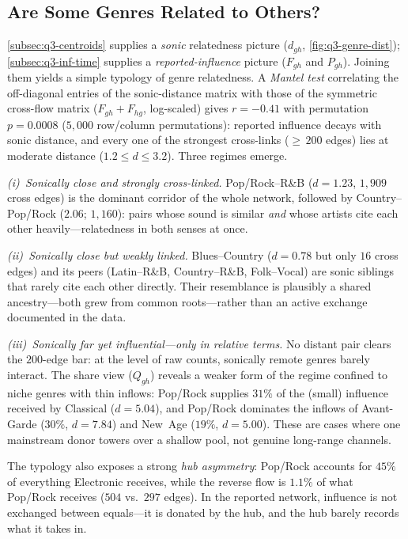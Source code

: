 \subsection{Are Some Genres Related to Others?}\label{subsec:q3-related}

\cref{subsec:q3-centroids} supplies a \emph{sonic} relatedness picture
($d_{gh}$, \cref{fig:q3-genre-dist}); \cref{subsec:q3-inf-time} supplies a
\emph{reported-influence} picture ($F_{gh}$ and $P_{gh}$). Joining them
yields a simple typology of genre relatedness. A \emph{Mantel test}
correlating the off-diagonal entries of the sonic-distance matrix with
those of the symmetric cross-flow matrix ($F_{gh}+F_{hg}$,
log-scaled) gives $r=-0.41$ with permutation $p=0.0008$
($5{,}000$ row/column permutations): reported influence decays with sonic
distance, and every one of the strongest cross-links
(${\ge}\,200$ edges) lies at moderate distance
($1.2\le d\le 3.2$). Three regimes emerge.

\emph{(i)~Sonically close and strongly cross-linked.} Pop/Rock--R\&B
($d=1.23$, $1{,}909$ cross edges) is the dominant corridor of the whole
network, followed by Country--Pop/Rock ($2.06$; $1{,}160$): pairs whose
sound is similar \emph{and} whose artists cite each other
heavily---relatedness in both senses at once.

\emph{(ii)~Sonically close but weakly linked.} Blues--Country
($d=0.78$ but only $16$ cross edges) and its peers (Latin--R\&B,
Country--R\&B, Folk--Vocal) are sonic siblings that rarely cite each
other directly. Their resemblance is plausibly a shared
ancestry---both grew from common roots---rather than
an active exchange documented in the data.

\emph{(iii)~Sonically far yet influential---only in relative terms.} No
distant pair clears the $200$-edge bar: at the level of raw counts,
sonically remote genres barely interact. The share view
($Q_{gh}$) reveals a weaker form of the regime confined to niche genres
with thin inflows: Pop/Rock supplies $31\%$ of the (small) influence
received by Classical ($d=5.04$), and Pop/Rock dominates the inflows of
Avant-Garde ($30\%$, $d=7.84$) and New~Age ($19\%$, $d=5.00$). These are
cases where one mainstream donor towers over a shallow pool, not genuine
long-range channels.

The typology also exposes a strong \emph{hub asymmetry}: Pop/Rock
accounts for $45\%$ of everything Electronic receives, while the reverse
flow is $1.1\%$ of what Pop/Rock receives ($504$ vs.\ $297$ edges). In
the reported network, influence is not exchanged between equals---it is
donated by the hub, and the hub barely records what it takes in.
